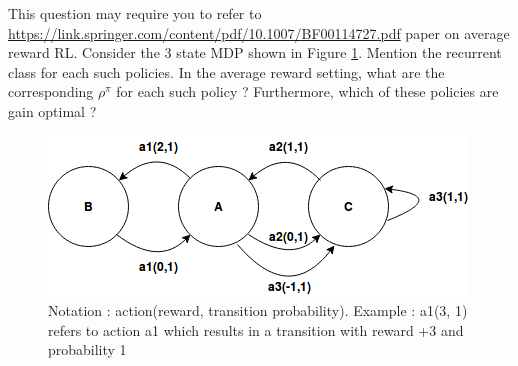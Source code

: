 \documentclass[solution,addpoints,12pt]{exam}
\begin{document}
\begin{questions}

\question[6] This question may require you to refer to \href{this}{https://link.springer.com/content/pdf/10.1007/BF00114727.pdf} paper on average reward RL. Consider the 3 state MDP shown in Figure \ref{fig:avg}.  Mention the recurrent class for each such policies. In the average reward setting, what are the corresponding $\rho^{\pi}$ for each such policy ? Furthermore, which of these policies are gain optimal ? 

    \begin{figure}[h]
        \centering
        \includegraphics[scale=0.6]{average_reward.png}
        \caption{Notation : action(reward, transition probability). Example : a1(3, 1) refers to action a1 which results in a transition with reward +3 and probability 1}
        \label{fig:avg}
    \end{figure}

\end{questions}
\end{document}

